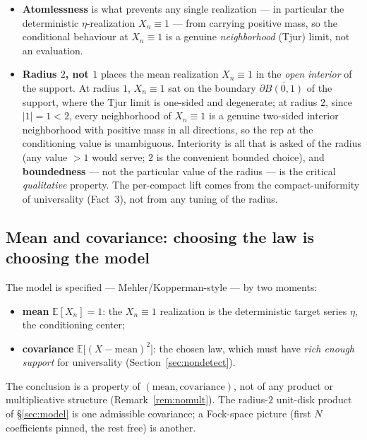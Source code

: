 \documentclass[11pt,a4paper]{article}
\theoremstyle{definition}
\begin{document}
\begin{itemize}
  \item \textbf{Atomlessness} is what prevents any single realization --- in particular
        the deterministic \(\eta\)-realization \(X_n\equiv1\) --- from carrying positive
        mass, so the conditional behaviour at \(X_n\equiv1\) is a genuine
        \emph{neighborhood} (Tjur) limit, not an evaluation.
  \item \textbf{Radius \(2\), not \(1\)} places the mean realization \(X_n\equiv1\)
        in the \emph{open interior} of the support. At radius \(1\), \(X_n\equiv1\) sat on the
        boundary \(\partial\overline{B(0,1)}\) of the support, where the Tjur limit is
        one-sided and degenerate; at radius \(2\), since \(|1|=1<2\), every neighborhood of
        \(X_n\equiv1\) is a genuine two-sided interior neighborhood with positive mass in all
        directions, so the rcp at the conditioning value is unambiguous. Interiority is all that
        is asked of the radius (any value \(>1\) would serve; \(2\) is the convenient bounded
        choice), and \textbf{boundedness} --- not the particular value of the radius --- is the
        critical \emph{qualitative} property. The per-compact lift comes from the
        compact-uniformity of universality (Fact~3), not from any tuning of the radius.
\end{itemize}

\subsection{Mean and covariance: choosing the law is choosing the model}\label{sec:general}

The model is specified --- Mehler/Kopperman-style --- by two moments:
\begin{itemize}
  \item \textbf{mean} \(\mathbb{E}[X_n]=1\): the \(X_n\equiv1\) realization is the
        deterministic target series \(\eta\), the conditioning center;
  \item \textbf{covariance} \(\mathbb{E}\bigl[(X-\text{mean})^2\bigr]\): the chosen law,
        which must have \emph{rich enough support} for universality (Section~\ref{sec:nondetect}).
\end{itemize}
The conclusion is a property of \((\text{mean},\text{covariance})\), not of any product or
multiplicative structure (Remark~\ref{rem:nomult}). The radius-\(2\) unit-disk product of
\S\ref{sec:model} is one admissible covariance; a Fock-space picture (first \(N\)
coefficients pinned, the rest free) is another.
\end{document}
